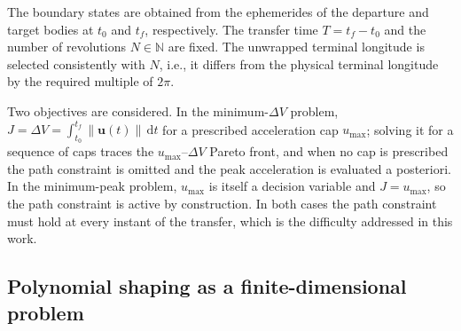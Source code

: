 \documentclass[a4paper,fleqn]{cas-sc}
\begin{document}
The boundary states are obtained from the ephemerides of the departure and
target bodies at $t_0$ and $t_f$, respectively. The transfer time
$T=t_f-t_0$ and the number of revolutions $N\in\mathbb{N}$ are fixed. The
unwrapped terminal longitude is selected consistently with $N$, i.e., it
differs from the physical terminal longitude by the required multiple of
$2\pi$.

Two objectives are considered. In the minimum-$\Delta V$ problem,
$J=\Delta V=\int_{t_0}^{t_f}\lVert\mathbf{u}(t)\rVert\,\mathrm{d}t$ for a
prescribed acceleration cap $u_{\max}$; solving it for a sequence of caps
traces the $u_{\max}$--$\Delta V$ Pareto front, and when no cap is prescribed
the path constraint is omitted and the peak acceleration is evaluated a
posteriori. In the minimum-peak problem, $u_{\max}$ is itself a decision
variable and $J=u_{\max}$, so the path constraint is active by construction.
In both cases the path constraint must hold at every instant of the transfer,
which is the difficulty addressed in this work.

\subsection{Polynomial shaping as a finite-dimensional problem}
\label{sec:shaping}
\end{document}
